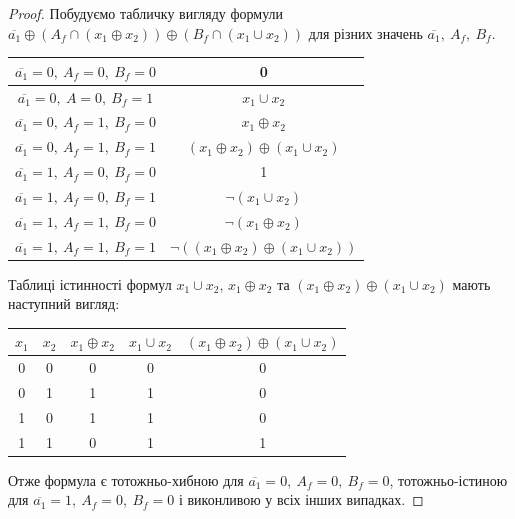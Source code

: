 \documentclass[a4paper,12pt]{article} \usepackage{a4wide}
\numberwithin{equation}{subsection}
\begin{document}
\begin{proof} Побудуємо табличку вигляду формули $\overline{a_1}\oplus
  (A_f\cap (x_1\oplus x_2))\oplus (B_f\cap (x_1\cup x_2))$ для різних
  значень $\overline{a_1},\ A_f,\ B_f$.

  \begin{center}



  \begin{tabular}{|c|c|}
    \hline
    $ \overline{a_1}=0,\ A_f=0,\ B_f=0$ & 0\\
    \hline

    $ \overline{a_1}=0,\ A=0,\ B_f=1$ & $x_1\cup x_2$\\
    \hline

    $ \overline{a_1}=0,\ A_f=1,\ B_f=0$ & $x_1\oplus x_2$\\
    \hline

    $ \overline{a_1}=0,\ A_f=1,\ B_f=1$ & $(x_1\oplus x_2)\oplus (x_1\cup x_2)$\\
    \hline

    $ \overline{a_1}=1,\ A_f=0,\ B_f=0$ & 1\\
    \hline

    $ \overline{a_1}=1,\ A_f=0,\ B_f=1$ & $\neg(x_1\cup x_2)$\\
    \hline

    $ \overline{a_1}=1,\ A_f=1,\ B_f=0$ & $\neg(x_1\oplus x_2)$\\
    \hline

    $ \overline{a_1}=1,\ A_f=1,\ B_f=1$ & $\neg((x_1\oplus x_2)\oplus (x_1\cup x_2))$\\
    \hline


  \end{tabular}

\end{center}

Таблиці істинності формул $x_1\cup x_2$, $x_1\oplus x_2$ та
$(x_1\oplus x_2)\oplus (x_1\cup x_2)$ мають наступний вигляд:


\begin{center}
  \begin{tabular}{|c|c|c|c|c|}

    \hline
    $x_1$  &  $x_2$ & $x_1\oplus x_2$  & $x_1\cup x_2$&  $(x_1\oplus x_2)\oplus (x_1\cup x_2)$\\
    \hline

    0 & 0 & 0  & 0&  0\\
    \hline
    0 & 1 & 1  & 1&  0\\
    \hline
    1 & 0 & 1  & 1&  0\\
    \hline
    1 & 1 & 0  & 1&  1\\
    \hline
  \end{tabular}
\end{center}

Отже формула є тотожньо-хибною для $ \overline{a_1}=0,\ A_f=0,\
B_f=0$, тотожньо-істиною для $ \overline{a_1}=1,\ A_f=0,\ B_f=0$ і
виконливою у всіх інших випадках.
\end{proof}
\end{document}
